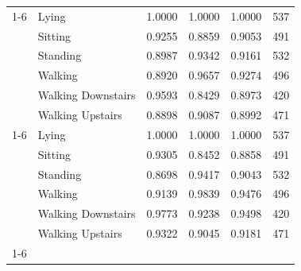 \begin{table}
\begin{tabular}{llrrrr}
\cline{1-6}
\multirow[t]{6}{*}{Random Forest} & Lying & 1.0000 & 1.0000 & 1.0000 & 537 \\
 & Sitting & 0.9255 & 0.8859 & 0.9053 & 491 \\
 & Standing & 0.8987 & 0.9342 & 0.9161 & 532 \\
 & Walking & 0.8920 & 0.9657 & 0.9274 & 496 \\
 & Walking Downstairs & 0.9593 & 0.8429 & 0.8973 & 420 \\
 & Walking Upstairs & 0.8898 & 0.9087 & 0.8992 & 471 \\
\cline{1-6}
\multirow[t]{6}{*}{Gradient Boosting} & Lying & 1.0000 & 1.0000 & 1.0000 & 537 \\
 & Sitting & 0.9305 & 0.8452 & 0.8858 & 491 \\
 & Standing & 0.8698 & 0.9417 & 0.9043 & 532 \\
 & Walking & 0.9139 & 0.9839 & 0.9476 & 496 \\
 & Walking Downstairs & 0.9773 & 0.9238 & 0.9498 & 420 \\
 & Walking Upstairs & 0.9322 & 0.9045 & 0.9181 & 471 \\
\cline{1-6}
\bottomrule
\end{tabular}
\end{table}
